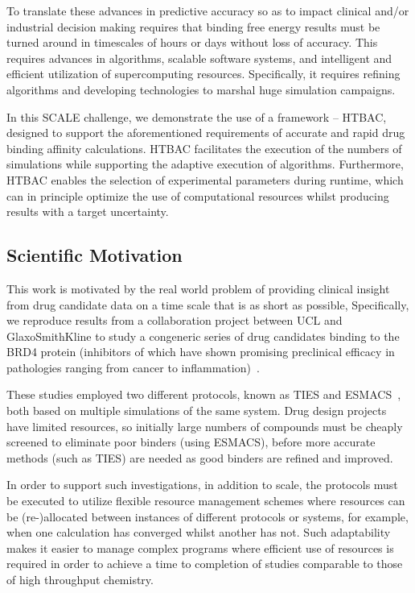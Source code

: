 \documentclass[conference]{IEEEtran}
\begin{document}
To translate these advances in predictive accuracy so as to impact clinical
and/or industrial decision making requires that binding free energy results
must be turned around in timescales of hours or days without loss of accuracy.
This requires advances in algorithms, scalable software systems, and
intelligent and efficient utilization of supercomputing resources.
Specifically, it requires refining algorithms and developing technologies to
marshal huge simulation campaigns.

In this SCALE challenge, we demonstrate the use of a framework -- HTBAC,
   designed to support the aforementioned requirements of accurate and rapid
   drug binding affinity calculations. HTBAC facilitates the execution of the
   numbers of simulations while supporting the adaptive execution of
   algorithms. Furthermore, HTBAC  enables the selection of experimental
   parameters during runtime, which can in principle optimize the use of
   computational resources whilst producing results with a target uncertainty.



\subsection{Scientific Motivation}\label{sec:motivation}

This work is motivated by the real world problem of providing clinical insight
from drug candidate data on a time scale that is as short as possible,
Specifically, we reproduce results from a collaboration project between UCL
and GlaxoSmithKline to study a congeneric series of drug candidates binding to
the BRD4 protein (inhibitors of which have shown promising preclinical
efficacy in pathologies ranging from cancer to
inflammation)~\cite{Wan2017brd4}.

These studies employed two different protocols, known as TIES and
ESMACS~\cite{Bhati2017}, both based on multiple simulations of the same
system. Drug design projects have limited resources, so initially large
numbers of compounds must be cheaply screened to eliminate poor binders (using
ESMACS), before more accurate methods (such as TIES) are needed as good
binders are refined and improved.

In order to support such investigations, in addition to scale, the protocols
must be executed to utilize  flexible resource management schemes where
resources can be (re-)allocated between instances of different protocols or
systems, for example, when one calculation has converged whilst another has
not. Such adaptability makes it easier to manage complex programs where
efficient use of resources is required in order to achieve a time to
completion of studies comparable to those of high throughput chemistry.
\end{document}
